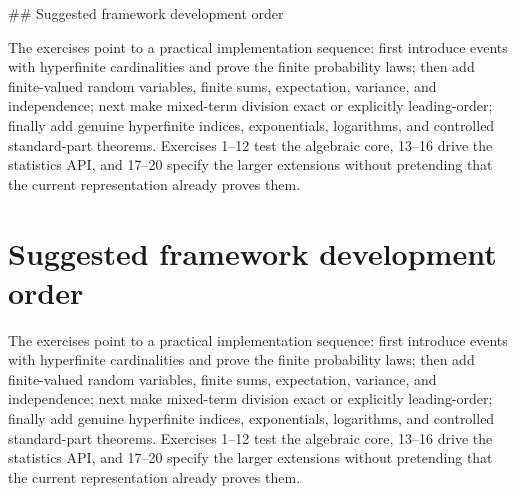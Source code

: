 \documentclass[11pt]{article}
\begin{document}
\#\# Suggested framework development order

The exercises point to a practical implementation sequence: first introduce
events with hyperfinite cardinalities and prove the finite probability laws;
then add finite-valued random variables, finite sums, expectation, variance,
and independence; next make mixed-term division exact or explicitly
leading-order; finally add genuine hyperfinite indices, exponentials,
logarithms, and controlled standard-part theorems. Exercises 1--12 test the
algebraic core, 13--16 drive the statistics API, and 17--20 specify the larger
extensions without pretending that the current representation already proves
them.


\section*{Suggested framework development order}

The exercises point to a practical implementation sequence: first introduce
events with hyperfinite cardinalities and prove the finite probability laws;
then add finite-valued random variables, finite sums, expectation, variance,
and independence; next make mixed-term division exact or explicitly
leading-order; finally add genuine hyperfinite indices, exponentials,
logarithms, and controlled standard-part theorems. Exercises 1--12 test the
algebraic core, 13--16 drive the statistics API, and 17--20 specify the larger
extensions without pretending that the current representation already proves
them.
\end{document}
